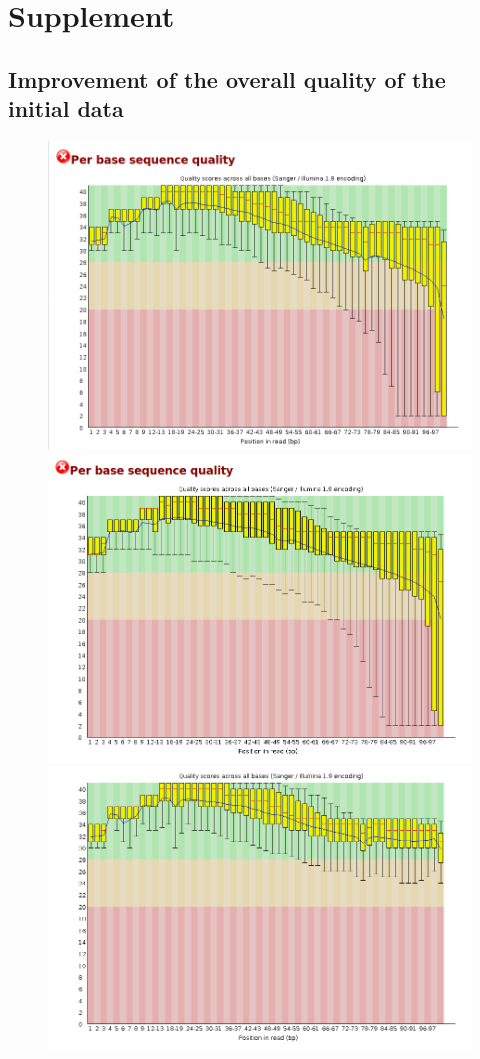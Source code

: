 \documentclass{article}
\begin{document}
 \section{Supplement}
 \subsection{Improvement of the overall quality of the initial data}
 \label{sec:supplement}
\begin{figure}[h]

\includegraphics[scale=0.35]{fow_prev_trim.png} 
\includegraphics[scale=0.35]{rev_prev_trim.png} \\
\includegraphics[scale=0.35]{fow_aft_trim.png}

\end{figure}
\end{document}

